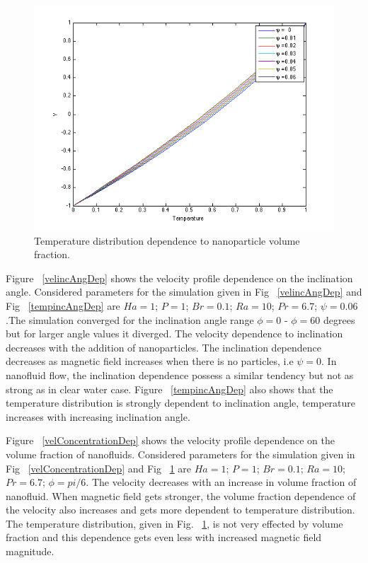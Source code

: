 \begin{figure}[t]
\begin{center}
\includegraphics[scale=0.78]{figures/tempConcentrationDep.png}
\end{center}
\caption{Temperature distribution dependence to nanoparticle volume fraction.}
\label{tempConcentrationDep} 
\end{figure}



Figure ~\ref{velincAngDep} shows the velocity profile dependence on the inclination angle. Considered parameters for the simulation given in Fig ~\ref{velincAngDep} and Fig ~\ref{tempincAngDep} are $Ha = 1$;  $P = 1 $;  $Br = 0.1 $;  $Ra = 10 $;   $Pr = 6.7 $;  $\psi =0.06 $.The simulation converged for the inclination angle range $\phi = 0$ - $\phi = 60$ degrees but for larger angle values it diverged. The velocity dependence to inclination decreases with the addition of nanoparticles. The inclination dependence decreases  as magnetic field increases when there is no particles, i.e $\psi  = 0$. In nanofluid flow, the inclination dependence possess a similar tendency but not as strong as in clear water case.  Figure ~\ref{tempincAngDep} also shows that the temperature distribution is strongly dependent to inclination angle, temperature increases with increasing inclination angle. 

Figure ~\ref{velConcentrationDep} shows the velocity profile dependence on the volume fraction of nanofluids. Considered parameters for the simulation given in Fig ~\ref{velConcentrationDep} and Fig ~\ref{tempConcentrationDep} are $Ha = 1$; $P = 1$; $Br = 0.1$; $Ra = 10$; $Pr = 6.7$;  $\phi= pi / 6$. The velocity decreases with an increase in volume fraction of nanofluid. When magnetic field gets stronger, the volume fraction dependence of the velocity also increases and gets more dependent to temperature distribution.  The temperature distribution, given in Fig. ~\ref{tempConcentrationDep}, is not very effected by volume fraction and this dependence gets even less with increased magnetic field magnitude.

